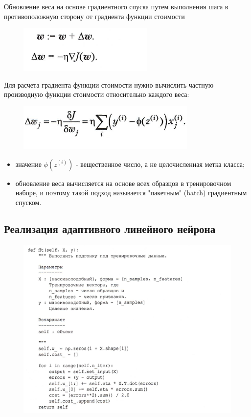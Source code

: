 \documentclass{beamer}
\begin{document}
\begin{frame}[t]
Обновление веса на основе градиентного спуска путем выполнения
шага в противоположную сторону от градиента функции стоимости
\begin{figure}[h]
\centering
\includegraphics[scale=0.75]{images/lec03-pic22.png}
\end{figure}
Для расчета градиента функции стоимости нужно вычислить частную производную функции стоимости относительно каждого веса: 
\begin{figure}[h]
\centering
\includegraphics[scale=0.75]{images/lec03-pic23.png}
\end{figure}
\begin{itemize}
\item значение $\phi(z^{(i)})$ - вещественное число, а не целочисленная метка класса;
\item обновление веса вычисляется на основе всех образцов в тренировочном наборе, и поэтому такой подход называется "пакетным" (batch) градиентным спуском.
\end{itemize}
\end{frame}

\subsection{Реализация адаптивного линейного нейрона}
\begin{frame}[t]
\begin{figure}[h]
\centering
\includegraphics[scale=0.6]{images/lec03-pic24.png}
\end{figure}
\end{frame}
\end{document}
